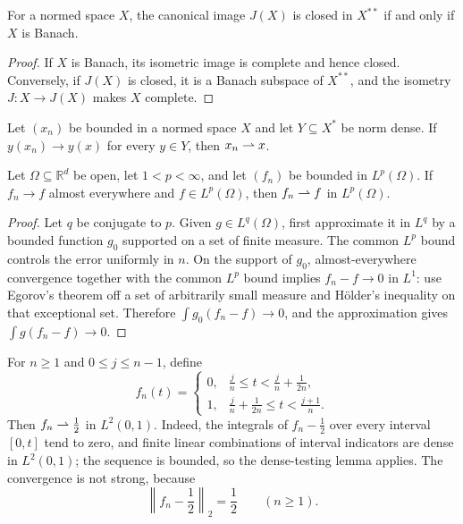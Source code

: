 \begin{notetheorem}
For a normed space $X$, the canonical image $J(X)$ is closed in $X^{**}$ if
and only if $X$ is Banach.
\end{notetheorem}

\begin{proof}
If $X$ is Banach, its isometric image is complete and hence closed.  Conversely,
if $J(X)$ is closed, it is a Banach subspace of $X^{**}$, and the isometry
$J\colon X\to J(X)$ makes $X$ complete.
\end{proof}

\begin{notelemma}
Let $(x_n)$ be bounded in a normed space $X$ and let $Y\subseteq X^*$ be
norm dense.  If $y(x_n)\to y(x)$ for every $y\in Y$, then $x_n\rightharpoonup x$.
\end{notelemma}

\begin{notetheorem}
Let $\Omega\subseteq\mathbb R^d$ be open, let $1<p<\infty$, and let
$(f_n)$ be bounded in $L^p(\Omega)$.  If $f_n\to f$ almost everywhere and
$f\in L^p(\Omega)$, then $f_n\rightharpoonup f$ in $L^p(\Omega)$.
\end{notetheorem}

\begin{proof}
Let $q$ be conjugate to $p$.  Given $g\in L^q(\Omega)$, first approximate it
in $L^q$ by a bounded function $g_0$ supported on a set of finite measure.
The common $L^p$ bound controls the error uniformly in $n$.  On the support of
$g_0$, almost-everywhere convergence together with the common $L^p$ bound
implies $f_n-f\to0$ in $L^1$: use Egorov's theorem off a set of arbitrarily
small measure and H\"older's inequality on that exceptional set.  Therefore
$\int g_0(f_n-f)\to0$, and the approximation gives
$\int g(f_n-f)\to0$.
\end{proof}

\begin{noteexample}
For $n\ge1$ and $0\le j\le n-1$, define
\[
 f_n(t)=
 \begin{cases}
   0,&\displaystyle \frac jn\le t<\frac jn+\frac1{2n},\\[4pt]
   1,&\displaystyle \frac jn+\frac1{2n}\le t<\frac{j+1}{n}.
 \end{cases}
\]
Then $f_n\rightharpoonup\tfrac12$ in $L^2(0,1)$.  Indeed, the integrals of
$f_n-\tfrac12$ over every interval $[0,t]$ tend to zero, and finite linear
combinations of interval indicators are dense in $L^2(0,1)$; the sequence is
bounded, so the dense-testing lemma applies.  The convergence is not strong,
because
\[
  \left\|f_n-\frac12\right\|_2=\frac12
  \qquad(n\ge1).
\]
\end{noteexample}

